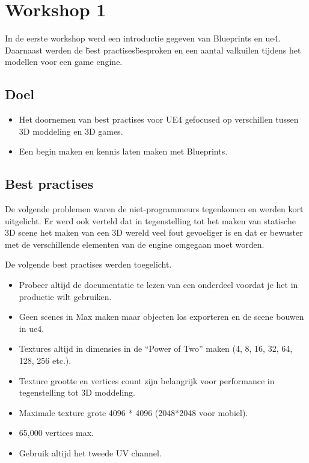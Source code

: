 
\chapter{Workshop 1}
\label{appendix:workshop1}
\lhead{}
In de eerste workshop werd een introductie gegeven van Blueprints en \gls{ue4}.
Daarnaast werden de \"best practises\" besproken en een aantal valkuilen tijdens het modellen voor een game engine.

\section{Doel}
\begin{itemize}
	\item Het doornemen van best practises voor UE4 gefocused op verschillen tussen 3D moddeling en 3D games. 
	\item Een begin maken en kennis laten maken met Blueprints.
\end{itemize}

\section{Best practises}
De volgende problemen waren de niet-programmeurs tegenkomen en werden kort uitgelicht. Er werd ook verteld dat in tegenstelling tot het maken van statische 3D scene het maken van een 3D wereld veel fout gevoeliger is en dat er bewuster met de verschillende elementen van de engine omgegaan moet worden.

De volgende best practises werden toegelicht.
\begin{itemize}
	\item Probeer altijd de documentatie te lezen van een onderdeel voordat je het in productie wilt gebruiken.
	\item Geen scenes in Max maken maar objecten los exporteren en de scene bouwen in \gls{ue4}.
	\item Textures altijd in dimensies in de “Power of Two” maken (4, 8, 16, 32, 64, 128, 256 etc.).
	\item Texture grootte en vertices count zijn belangrijk voor performance in tegenstelling tot 3D moddeling.
	\item Maximale texture grote 4096 * 4096 (2048*2048 voor mobiel).
	\item 65,000 vertices max.
	\item Gebruik altijd het tweede UV channel.
\end{itemize}

